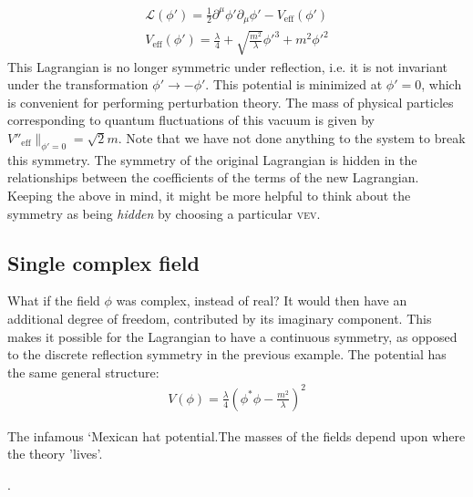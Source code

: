 \begin{align}
\mathcal{L}(\phi') = \frac{1}{2}\partial^\mu\phi'\partial_\mu\phi' - V_\text{eff}(\phi')\\
V_\text{eff}(\phi') = \frac{\lambda}{4} + \sqrt{\frac{m^2}{\lambda}}\phi'^3 + m^2\phi'^2
\label{eq:potential_hidden_symmetry}
\end{align}
This Lagrangian is no longer symmetric under reflection, i.e. it is not invariant under the transformation $\phi'\rightarrow -\phi'$. This potential is minimized at $\phi' = 0$, which is convenient for performing perturbation theory. The mass of physical particles corresponding to quantum fluctuations of this vacuum is given by $V''_\text{eff}\|_{\phi' = 0} = \sqrt{2}m$. Note that we have not done anything to the system to break this symmetry. The symmetry of the original Lagrangian is hidden in the relationships between the coefficients of the terms of the new Lagrangian. Keeping the above in mind, it might be more helpful to think about the symmetry as being \emph{hidden} by choosing a particular \textsc{vev}.

\subsection{Single complex field}

What if the field $\phi$ was complex, instead of real? It would then have an additional degree of freedom, contributed by its imaginary component. This makes it possible for the Lagrangian to have a continuous symmetry, as opposed to the discrete reflection symmetry in the previous example. The potential has the same general structure:
\begin{align}
V(\phi) = \frac{\lambda}{4}\left(\phi^{*}\phi - \frac{m^2}{\lambda}\right)^2
\label{eq:single_complex_field_potential}
\end{align}

\begin{marginfigure}
\caption{The infamous `Mexican hat potential.The masses of the fields depend upon where the theory 'lives'. }.
\end{marginfigure}

